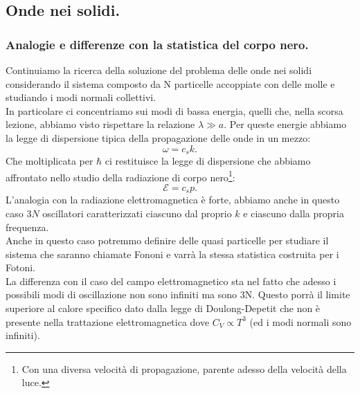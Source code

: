 \subsection{Onde nei solidi.}
\label{subsec:Onde nei solidi.}
\subsubsection{Analogie e differenze con la statistica del corpo nero.}
\label{subsubsec:Analogie e differenze con la statistica del corpo nero.}
Continuiamo la ricerca della soluzione del problema delle onde nei solidi considerando il sistema composto da N particelle accoppiate con delle molle e studiando i modi normali collettivi.\\ 
In particolare ci concentriamo sui modi di bassa energia, quelli che, nella scorsa lezione, abbiamo visto rispettare la relazione $\lambda \gg a$.
Per queste energie abbiamo la legge di dispersione tipica della propagazione delle onde in un mezzo:
\[
	\omega = c_s k
.\] 
Che moltiplicata per $\hbar$ ci restituisce la legge di dispersione che abbiamo affrontato nello studio della radiazione di corpo nero\footnote{Con una diversa velocità di propagazione, parente adesso della velocità della luce.}:
\[
	\mathcal{E} = c_s p
.\] 
L'analogia con la radiazione elettromagnetica è forte, abbiamo anche in questo caso $3N$ oscillatori caratterizzati ciascuno dal proprio $k$ e ciascuno dalla propria frequenza.\\
Anche in questo caso potremmo definire delle quasi particelle per studiare il sistema che saranno chiamate Fononi e varrà la stessa statistica costruita per i Fotoni.\\
La differenza con il caso del campo elettromagnetico sta nel fatto che adesso i possibili modi di oscillazione non sono infiniti ma sono 3N. Questo porrà il limite superiore al calore specifico dato dalla legge di Doulong-Depetit che non è presente nella trattazione elettromagnetica dove $C_V \propto T^{3}$ (ed i modi normali sono infiniti).\\
